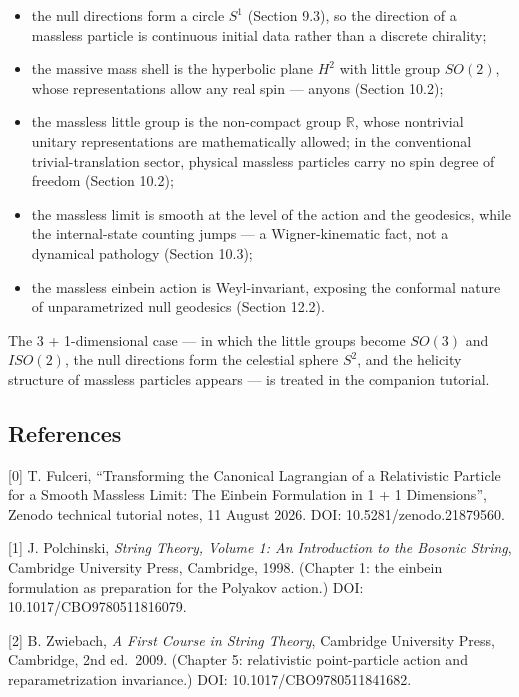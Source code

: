 \documentclass[
]{article}
\providecommand{\tightlist}{%
  \setlength{\itemsep}{0pt}\setlength{\parskip}{0pt}}
\begin{document}
\begin{itemize}
\tightlist
\item
  the null directions form a circle \(S^{1}\) (Section 9.3), so the
  direction of a massless particle is continuous initial data rather
  than a discrete chirality;
\item
  the massive mass shell is the hyperbolic plane \(H^{2}\) with little
  group \(SO(2)\), whose representations allow any real spin --- anyons
  (Section 10.2);
\item
  the massless little group is the non-compact group \(\mathbb{R}\),
  whose nontrivial unitary representations are mathematically allowed;
  in the conventional trivial-translation sector, physical massless
  particles carry no spin degree of freedom (Section 10.2);
\item
  the massless limit is smooth at the level of the action and the
  geodesics, while the internal-state counting jumps --- a
  Wigner-kinematic fact, not a dynamical pathology (Section 10.3);
\item
  the massless einbein action is Weyl-invariant, exposing the conformal
  nature of unparametrized null geodesics (Section 12.2).
\end{itemize}

The 3 + 1-dimensional case --- in which the little groups become
\(SO(3)\) and \(ISO(2)\), the null directions form the celestial sphere
\(S^{2}\), and the helicity structure of massless particles appears ---
is treated in the companion tutorial.

\hypertarget{references}{%
\subsection{References}\label{references}}

{[}0{]} T. Fulceri, ``Transforming the Canonical Lagrangian of a
Relativistic Particle for a Smooth Massless Limit: The Einbein
Formulation in 1 + 1 Dimensions'', Zenodo technical tutorial notes, 11
August 2026. DOI: 10.5281/zenodo.21879560.

{[}1{]} J. Polchinski, \emph{String Theory, Volume 1: An Introduction to
the Bosonic String}, Cambridge University Press, Cambridge, 1998.
(Chapter 1: the einbein formulation as preparation for the Polyakov
action.) DOI: 10.1017/CBO9780511816079.

{[}2{]} B. Zwiebach, \emph{A First Course in String Theory}, Cambridge
University Press, Cambridge, 2nd ed.~2009. (Chapter 5: relativistic
point-particle action and reparametrization invariance.) DOI:
10.1017/CBO9780511841682.
\end{document}

